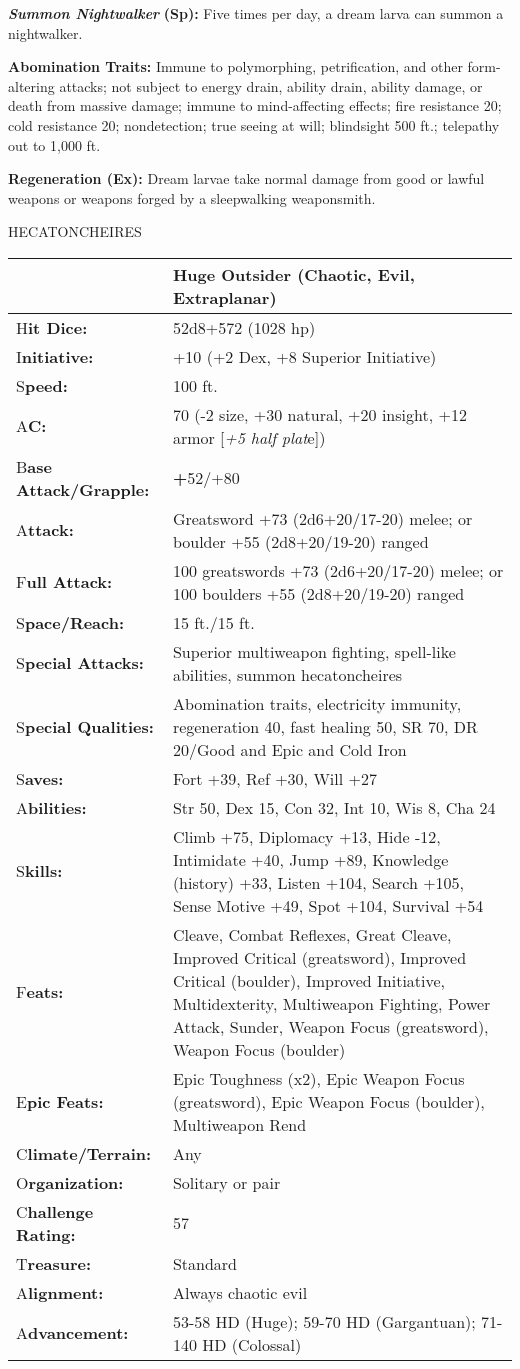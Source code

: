 \documentclass{article}
\begin{document}
\textit{\textbf{Summon Nightwalker }}\textbf{(Sp): }Five times per day, a dream 
larva can summon a nightwalker. 

\textbf{Abomination Traits:} Immune to polymorphing, petrification, and other form-altering 
attacks; not subject to energy drain, ability drain, ability damage, or death from 
massive damage; immune to mind-affecting effects; fire resistance 20; cold resistance 
20; nondetection; true seeing at will; blindsight 500 ft.; telepathy out to 1,000 
ft. 

\textbf{Regeneration (Ex): }Dream larvae take normal damage from good or lawful 
weapons or weapons forged by a sleepwalking weaponsmith. 

\vspace{12pt}
{\LARGE{}HECATONCHEIRES}

\begin{tabular}{|>{\raggedright}p{67pt}|>{\raggedright}p{258pt}|}
\hline
  & Huge Outsider (Chaotic, Evil, Extraplanar) \tabularnewline
\hline
H\textbf{it Dice:} &  52d8+572 (1028 hp) \tabularnewline
\hline
I\textbf{nitiative:} &  +10 (+2 Dex, +8 Superior Initiative) \tabularnewline
\hline
S\textbf{peed:} &  100 ft. \tabularnewline
\hline
A\textbf{C:} &  70 (-2 size, +30 natural, +20 insight, +12 armor [\textit{+5 half 
plat}e]) \tabularnewline
\hline
B\textbf{ase Attack/Grapple:} &  \textbf{+}52/+80\tabularnewline
\hline
A\textbf{ttack:} &  Greatsword +73 (2d6+20/17-20) melee; or boulder +55 (2d8+20/19-20) 
ranged\tabularnewline
\hline
F\textbf{ull Attack:} &  100 greatswords +73 (2d6+20/17-20) melee; or 100 boulders 
+55 (2d8+20/19-20) ranged\tabularnewline
\hline
S\textbf{pace/Reach:} &  15 ft./15 ft. \tabularnewline
\hline
S\textbf{pecial Attacks:} &  Superior multiweapon fighting, spell-like abilities, 
summon hecatoncheires \tabularnewline
\hline
S\textbf{pecial Qualities:} &  Abomination traits, electricity immunity, regeneration 
40, fast healing 50, SR 70, DR 20/Good and Epic and Cold Iron \tabularnewline
\hline
S\textbf{aves:} &  Fort +39, Ref +30, Will +27 \tabularnewline
\hline
A\textbf{bilities:} &  Str 50, Dex 15, Con 32, Int 10, Wis 8, Cha 24 \tabularnewline
\hline
S\textbf{kills:} & Climb +75, Diplomacy +13, Hide -12, Intimidate +40, Jump +89, 
Knowledge (history) +33, Listen +104, Search +105, Sense Motive +49, Spot +104, 
Survival +54\tabularnewline
\hline
F\textbf{eats:} &  Cleave, Combat Reflexes, Great Cleave, Improved Critical (greatsword), 
Improved Critical (boulder), Improved Initiative, Multidexterity, Multiweapon Fighting, 
Power Attack, Sunder, Weapon Focus (greatsword), Weapon Focus (boulder) \tabularnewline
\hline
E\textbf{pic Feats:} &  Epic Toughness (x2), Epic Weapon Focus (greatsword), Epic 
Weapon Focus (boulder), Multiweapon Rend \tabularnewline
\hline
C\textbf{limate/Terrain:} &  Any \tabularnewline
\hline
O\textbf{rganization:} &  Solitary or pair \tabularnewline
\hline
C\textbf{hallenge Rating:} &  57 \tabularnewline
\hline
T\textbf{reasure:} &  Standard \tabularnewline
\hline
A\textbf{lignment:} &  Always chaotic evil \tabularnewline
\hline
A\textbf{dvancement:} &  53-58 HD (Huge); 59-70 HD (Gargantuan); 71-140 HD (Colossal) 
\tabularnewline
\hline
\end{tabular}
\end{document}
